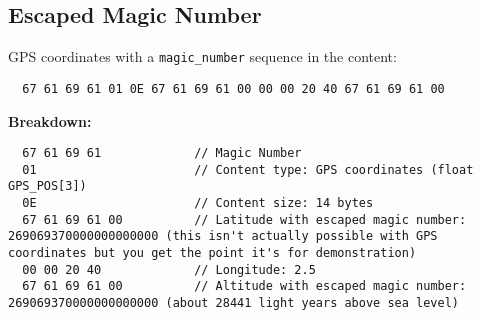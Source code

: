 \documentclass[a4paper]{article}
\begin{document}
\subsection{Escaped Magic Number}
GPS coordinates with a \texttt{magic\_number} sequence in the content:
\begin{verbatim}
  67 61 69 61 01 0E 67 61 69 61 00 00 00 20 40 67 61 69 61 00
\end{verbatim}
\textbf{Breakdown:}
\begin{verbatim}
  67 61 69 61             // Magic Number
  01                      // Content type: GPS coordinates (float GPS_POS[3])
  0E                      // Content size: 14 bytes
  67 61 69 61 00          // Latitude with escaped magic number: 269069370000000000000 (this isn't actually possible with GPS coordinates but you get the point it's for demonstration)
  00 00 20 40             // Longitude: 2.5
  67 61 69 61 00          // Altitude with escaped magic number: 269069370000000000000 (about 28441 light years above sea level)
\end{verbatim}
\end{document}
